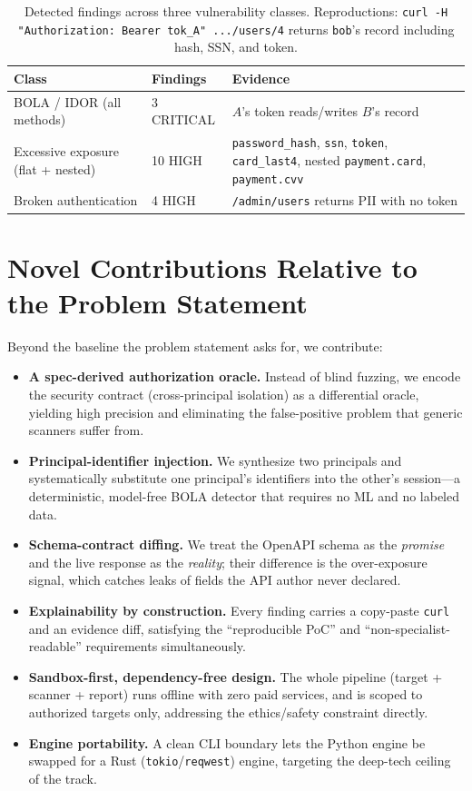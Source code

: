 \documentclass[11pt]{article}
\begin{document}
\begin{table}[h]
\centering
\begin{tabular}{lll}
\toprule
\textbf{Class} & \textbf{Findings} & \textbf{Evidence} \\
\midrule
BOLA / IDOR (all methods) & 3 CRITICAL & $A$'s token reads/writes $B$'s record \\
Excessive exposure (flat + nested) & 10 HIGH & \texttt{password\_hash}, \texttt{ssn}, \texttt{token}, \texttt{card\_last4}, nested \texttt{payment.card}, \texttt{payment.cvv} \\
Broken authentication & 4 HIGH & \texttt{/admin/users} returns PII with no token \\
\bottomrule
\end{tabular}
\caption{Detected findings across three vulnerability classes. Reproductions: \texttt{curl -H "Authorization: Bearer tok\_A" .../users/4} returns \texttt{bob}'s record including hash, SSN, and token.}
\label{tab:findings}
\end{table}

\section{Novel Contributions Relative to the Problem Statement}
Beyond the baseline the problem statement asks for, we contribute:

\begin{itemize}
  \item \textbf{A spec-derived authorization oracle.} Instead of blind fuzzing, we encode
        the security contract (cross-principal isolation) as a differential oracle, yielding
        high precision and eliminating the false-positive problem that generic scanners
        suffer from.
  \item \textbf{Principal-identifier injection.} We synthesize two principals and
        systematically substitute one principal's identifiers into the other's session---a
        deterministic, model-free BOLA detector that requires no ML and no labeled data.
  \item \textbf{Schema-contract diffing.} We treat the OpenAPI schema as the \emph{promise}
        and the live response as the \emph{reality}; their difference is the over-exposure
        signal, which catches leaks of fields the API author never declared.
  \item \textbf{Explainability by construction.} Every finding carries a copy-paste
        \texttt{curl} and an evidence diff, satisfying the ``reproducible PoC'' and
        ``non-specialist-readable'' requirements simultaneously.
  \item \textbf{Sandbox-first, dependency-free design.} The whole pipeline (target +
        scanner + report) runs offline with zero paid services, and is scoped to
        authorized targets only, addressing the ethics/safety constraint directly.
  \item \textbf{Engine portability.} A clean CLI boundary lets the Python engine be swapped
        for a Rust (\texttt{tokio}/\texttt{reqwest}) engine, targeting the deep-tech
        ceiling of the track.
\end{itemize}
\end{document}
